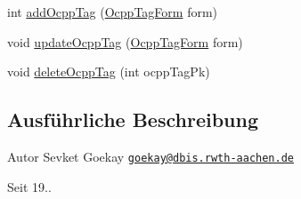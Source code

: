 \begin{DoxyCompactItemize}
int \hyperlink{interfacede_1_1rwth_1_1idsg_1_1steve_1_1repository_1_1_ocpp_tag_repository_a52d4d4413c85b4d75cbab87002578d93}{add\+Ocpp\+Tag} (\hyperlink{classde_1_1rwth_1_1idsg_1_1steve_1_1web_1_1dto_1_1_ocpp_tag_form}{Ocpp\+Tag\+Form} form)
\item 
void \hyperlink{interfacede_1_1rwth_1_1idsg_1_1steve_1_1repository_1_1_ocpp_tag_repository_ad0bf42dfe85dce4a3a92fbf908fe74b8}{update\+Ocpp\+Tag} (\hyperlink{classde_1_1rwth_1_1idsg_1_1steve_1_1web_1_1dto_1_1_ocpp_tag_form}{Ocpp\+Tag\+Form} form)
\item 
void \hyperlink{interfacede_1_1rwth_1_1idsg_1_1steve_1_1repository_1_1_ocpp_tag_repository_a1537f5848e9d9ee84d968da3857f1d91}{delete\+Ocpp\+Tag} (int ocpp\+Tag\+Pk)
\end{DoxyCompactItemize}


\subsection{Ausführliche Beschreibung}
\begin{DoxyAuthor}{Autor}
Sevket Goekay \href{mailto:goekay@dbis.rwth-aachen.de}{\tt goekay@dbis.\+rwth-\/aachen.\+de} 
\end{DoxyAuthor}
\begin{DoxySince}{Seit}
19.. 
\end{DoxySince}


